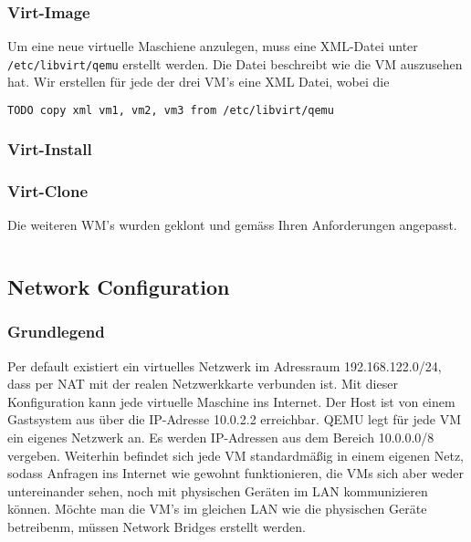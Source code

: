 \subsubsection{Virt-Image}
Um eine neue virtuelle Maschiene anzulegen, muss eine XML-Datei unter \lstinline|/etc/libvirt/qemu| erstellt werden. Die Datei beschreibt wie die VM auszusehen hat. 
Wir erstellen für jede der drei VM's eine XML Datei, wobei die 

\begin{lstlisting}[language=XML]
 TODO copy xml vm1, vm2, vm3 from /etc/libvirt/qemu
\end{lstlisting}

\subsubsection{Virt-Install}

\subsubsection{Virt-Clone}
Die weiteren WM's wurden geklont und gemäss Ihren Anforderungen angepasst.
\begin{lstlisting}[language=bash]

\end{lstlisting}


\subsection{Network Configuration}


\subsubsection{Grundlegend}
Per default existiert ein virtuelles Netzwerk im Adressraum 192.168.122.0/24, dass per NAT mit der realen Netzwerkkarte verbunden ist. Mit dieser Konfiguration kann jede virtuelle Maschine ins Internet. Der Host ist von einem Gastsystem aus über die IP-Adresse 10.0.2.2 erreichbar. QEMU legt für jede VM ein eigenes Netzwerk an. Es werden IP-Adressen aus dem Bereich 10.0.0.0/8 vergeben. Weiterhin befindet sich jede VM standardmäßig in einem eigenen Netz, sodass Anfragen ins Internet wie gewohnt funktionieren, die VMs sich aber weder untereinander sehen, noch mit physischen Geräten im LAN kommunizieren können. Möchte man die VM's im gleichen LAN wie die physischen Geräte betreibenm, müssen Network Bridges erstellt werden.


